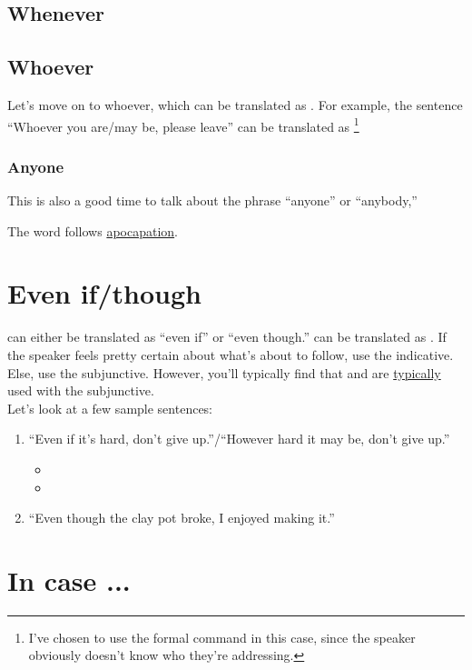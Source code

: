 \subsection{Whenever}


\subsection{Whoever}
Let's move on to whoever, which can be translated as . For example, the sentence  ``Whoever you are/may be, please leave'' can be translated as  \footnote{I've chosen to use the formal command in this case, since the speaker obviously doesn't know who they're addressing.}\\

\subsubsection{Anyone}
This is also a good time to talk about the phrase ``anyone'' or ``anybody,'' 


The word  follows \hyperref[sec:apo]{apocapation}. 

\section{Even if/though}

 can either be translated as ``even if'' or ``even though.''  can be translated as . If the speaker feels pretty certain about what's about to follow, use the indicative. Else, use the subjunctive. However, you'll typically find that  and  are \underline{typically} used with the subjunctive. \\

Let's look at a few sample sentences: 
\begin{enumerate}[noitemsep]
	\item ``Even if it's hard, don't give up.''/``However hard it may be, don't give up.'' \arr
		\begin{itemize}[noitemsep]
			\item {}
			\item {}
		\end{itemize}
	\item ``Even though the clay pot broke, I enjoyed making it.'' \arr {}
\end{enumerate}

\section{In case ...}
